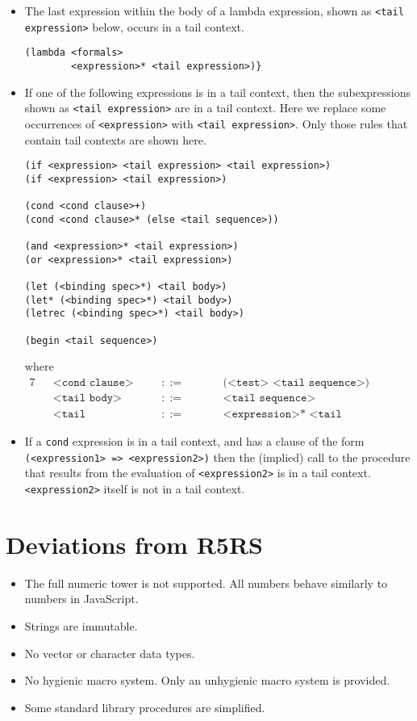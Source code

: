 \documentclass{article}
\begin{document}
\begin{itemize}
\item The last expression within the body of a lambda expression, shown as \texttt{<tail expression>} below, occurs in a tail context.
\begin{lstlisting}
(lambda <formals>
        <expression>* <tail expression>)}
\end{lstlisting}
\item If one of the following expressions is in a tail context, then the subexpressions shown as \texttt{<tail expression>} are in a tail context. Here we replace some occurrences of \texttt{<expression>} with \texttt{<tail expression>}. Only those rules that contain tail contexts are shown here.
\begin{lstlisting}
(if <expression> <tail expression> <tail expression>)
(if <expression> <tail expression>)

(cond <cond clause>+)
(cond <cond clause>* (else <tail sequence>))

(and <expression>* <tail expression>)
(or <expression>* <tail expression>)

(let (<binding spec>*) <tail body>)
(let* (<binding spec>*) <tail body>)
(letrec (<binding spec>*) <tail body>)

(begin <tail sequence>)
\end{lstlisting}
where
\begin{alignat*}{7}
&& \texttt{<cond clause>}   \quad &&::= &\quad && \texttt{(<test> <tail sequence>)}\\[1mm]
&& \texttt{<tail body>}    \quad&&::= &\quad && \texttt{<tail sequence>}\\[1mm]
&& \texttt{<tail sequence>}    &&::= &\quad && \texttt{<expression>* <tail expression>}
\end{alignat*}
\item If a \texttt{cond} expression is in a tail context, and has a clause of the form \texttt{(<expression1> => <expression2>)} then the (implied) call to the procedure that results from the evaluation of \texttt{<expression2>} is in a tail context. \texttt{<expression2>} itself is not in a tail context.
\end{itemize}



\section{Deviations from R5RS}

\begin{itemize}
\item The full numeric tower is not supported. All numbers behave similarly to numbers in JavaScript.
\item Strings are immutable.
\item No vector or character data types.
\item No hygienic macro system. Only an unhygienic macro system is provided.
\item Some standard library procedures are simplified.
\end{itemize}
\end{document}
